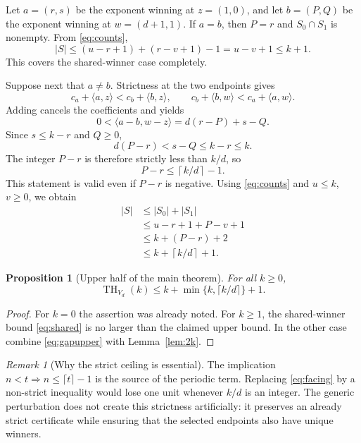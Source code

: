 \documentclass[11pt,a4paper]{article}
\numberwithin{equation}{section}
\newtheorem{proposition}[theorem]{Proposition}
\theoremstyle{definition}
\theoremstyle{remark}
\newtheorem{remark}[theorem]{Remark}
\newcommand{\tHilb}{\operatorname{TH}}
\newcommand{\ceil}[1]{\left\lceil #1\right\rceil}
\newcommand{\ip}[2]{\langle #1,#2\rangle}
\begin{document}
Let $a=(r,s)$ be the exponent winning at $z=(1,0)$, and let $b=(P,Q)$ be the
exponent winning at $w=(d+1,1)$. If $a=b$, then $P=r$ and $S_0\cap S_1$ is
nonempty. From \eqref{eq:counts},
\begin{equation}
\label{eq:shared}
|S|\leq(u-r+1)+(r-v+1)-1=u-v+1\leq k+1.
\end{equation}
This covers the shared-winner case completely.

Suppose next that $a\ne b$. Strictness at the two endpoints gives
\[
c_a+\ip{a}{z}<c_b+\ip{b}{z},
\qquad
c_b+\ip{b}{w}<c_a+\ip{a}{w}.
\]
Adding cancels the coefficients and yields
\begin{equation}
\label{eq:facing}
0<\ip{a-b}{w-z}=d(r-P)+s-Q.
\end{equation}
Since $s\leq k-r$ and $Q\geq0$,
\begin{equation}
\label{eq:budget}
d(P-r)<s-Q\leq k-r\leq k.
\end{equation}
The integer $P-r$ is therefore strictly less than $k/d$, so
\begin{equation}
\label{eq:ceiling}
P-r\leq\ceil{k/d}-1.
\end{equation}
This statement is valid even if $P-r$ is negative. Using
\eqref{eq:counts} and $u\leq k$, $v\geq0$, we obtain
\begin{align}
|S|&\leq |S_0|+|S_1|\nonumber\\
&\leq u-r+1+P-v+1\nonumber\\
&\leq k+(P-r)+2\nonumber\\
&\leq k+\ceil{k/d}+1.\label{eq:gapupper}
\end{align}

\begin{proposition}[Upper half of the main theorem]
\label{prop:upper}
For all $k\geq0$,
\[
\tHilb_{V_d}(k)\leq k+\min\{k,\lceil k/d\rceil\}+1.
\]
\end{proposition}

\begin{proof}
For $k=0$ the assertion was already noted. For $k\geq1$, the shared-winner
bound \eqref{eq:shared} is no larger than the claimed upper bound. In the
other case combine \eqref{eq:gapupper} with Lemma~\ref{lem:2k}.
\end{proof}

\begin{remark}[Why the strict ceiling is essential]
The implication $n<t\Rightarrow n\leq\lceil t\rceil-1$ is the source of the
periodic term. Replacing \eqref{eq:facing} by a non-strict inequality would lose
one unit whenever $k/d$ is an integer. The generic perturbation does not create
this strictness artificially: it preserves an already strict certificate
while ensuring that the selected endpoints also have unique winners.
\end{remark}
\end{document}

